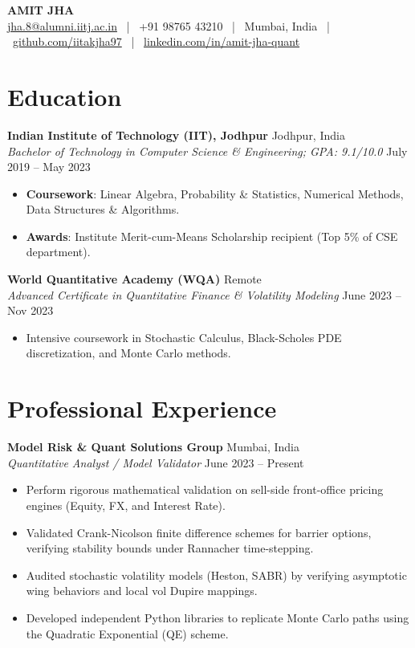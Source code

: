 \documentclass[10pt,letterpaper]{article}
\begin{document}
\pagestyle{empty}

\begin{center}
    {\Huge \textbf{AMIT JHA}} \\ \medskip
    \small
    \href{mailto:jha.8@alumni.iitj.ac.in}{jha.8@alumni.iitj.ac.in} \ | \ 
    +91 98765 43210 \ | \ 
    Mumbai, India \ | \ 
    \href{https://github.com/iitakjha97}{github.com/iitakjha97} \ | \ 
    \href{https://linkedin.com/in/amit-jha-quant}{linkedin.com/in/amit-jha-quant}
\end{center}

\section{Education}
\textbf{Indian Institute of Technology (IIT), Jodhpur} \hfill Jodhpur, India \\
\textit{Bachelor of Technology in Computer Science \& Engineering; GPA: 9.1/10.0} \hfill July 2019 -- May 2023
\begin{itemize}
    \item \textbf{Coursework}: Linear Algebra, Probability \& Statistics, Numerical Methods, Data Structures \& Algorithms.
    \item \textbf{Awards}: Institute Merit-cum-Means Scholarship recipient (Top 5\% of CSE department).
\end{itemize}

\medskip

\textbf{World Quantitative Academy (WQA)} \hfill Remote \\
\textit{Advanced Certificate in Quantitative Finance \& Volatility Modeling} \hfill June 2023 -- Nov 2023
\begin{itemize}
    \item Intensive coursework in Stochastic Calculus, Black-Scholes PDE discretization, and Monte Carlo methods.
\end{itemize}

\section{Professional Experience}
\textbf{Model Risk \& Quant Solutions Group} \hfill Mumbai, India \\
\textit{Quantitative Analyst / Model Validator} \hfill June 2023 -- Present
\begin{itemize}
    \item Perform rigorous mathematical validation on sell-side front-office pricing engines (Equity, FX, and Interest Rate).
    \item Validated Crank-Nicolson finite difference schemes for barrier options, verifying stability bounds under Rannacher time-stepping.
    \item Audited stochastic volatility models (Heston, SABR) by verifying asymptotic wing behaviors and local vol Dupire mappings.
    \item Developed independent Python libraries to replicate Monte Carlo paths using the Quadratic Exponential (QE) scheme.
\end{itemize}
\end{document}
